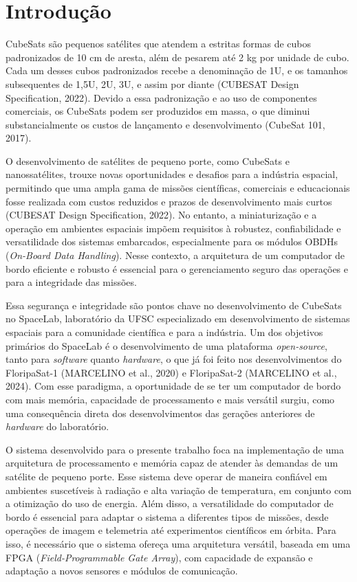 \chapter{Introdução}
\label{Chap:intro}

CubeSats são pequenos satélites que atendem a estritas formas de cubos padronizados de 10 cm de aresta, além de pesarem até 2 kg por unidade de cubo. Cada um desses cubos padronizados recebe a denominação de 1U, e os tamanhos subsequentes de 1,5U, 2U, 3U, e assim por diante (CUBESAT Design Specification, 2022). Devido a essa padronização e ao uso de componentes comerciais, os CubeSats podem ser produzidos em massa, o que diminui substancialmente os custos de lançamento e desenvolvimento (CubeSat 101, 2017).

O desenvolvimento de satélites de pequeno porte, como CubeSats e nanossatélites, trouxe novas oportunidades e desafios para a indústria espacial, permitindo que uma ampla gama de missões científicas, comerciais e educacionais fosse realizada com custos reduzidos e prazos de desenvolvimento mais curtos (CUBESAT Design Specification, 2022). No entanto, a miniaturização e a operação em ambientes espaciais impõem requisitos à robustez, confiabilidade e versatilidade dos sistemas embarcados, especialmente para os módulos OBDHs (\textit{On-Board Data Handling}). Nesse contexto, a arquitetura de um computador de bordo eficiente e robusto é essencial para o gerenciamento seguro das operações e para a integridade das missões.

Essa segurança e integridade são pontos chave no desenvolvimento de CubeSats no SpaceLab, laboratório da UFSC especializado em desenvolvimento de sistemas espaciais para a comunidade científica e para a indústria. Um dos objetivos primários do SpaceLab é o desenvolvimento de uma plataforma \textit{open-source}, tanto para \textit{software} quanto \textit{hardware}, o que já foi feito nos desenvolvimentos do FloripaSat-1 (MARCELINO et al., 2020) e FloripaSat-2 (MARCELINO et al., 2024). Com esse paradigma, a oportunidade de se ter um computador de bordo com mais memória, capacidade de processamento e mais versátil surgiu, como uma consequência direta dos desenvolvimentos das gerações anteriores de \textit{hardware} do laboratório.

O sistema desenvolvido para o presente trabalho foca na implementação de uma arquitetura de processamento e memória capaz de atender às demandas de um satélite de pequeno porte. Esse sistema deve operar de maneira confiável em ambientes suscetíveis à radiação e alta variação de temperatura, em conjunto com a otimização do uso de energia. Além disso, a versatilidade do computador de bordo é essencial para adaptar o sistema a diferentes tipos de missões, desde operações de imagem e telemetria até experimentos científicos em órbita. Para isso, é necessário que o sistema ofereça uma arquitetura versátil, baseada em uma FPGA (\textit{Field-Programmable Gate Array}), com capacidade de expansão e adaptação a novos sensores e módulos de comunicação.

